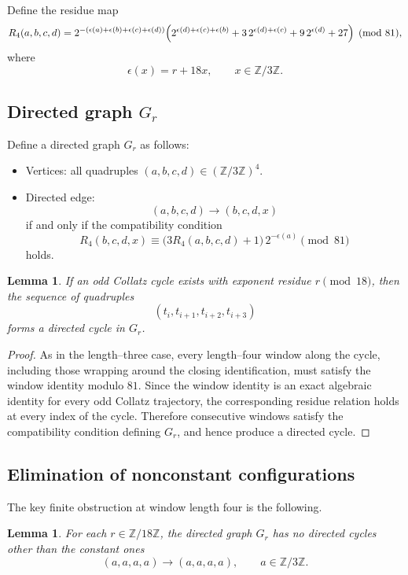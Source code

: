 \documentclass[11pt]{article}
\theoremstyle{definition}
\theoremstyle{plain}
\newtheorem{lemma}[theorem]{Lemma}
\theoremstyle{remark}
\begin{document}
Define the residue map
\begin{equation}\label{eq:R4def}
R_4(a,b,c,d)
=
2^{-(\epsilon(a)+\epsilon(b)+\epsilon(c)+\epsilon(d))}
\Bigl(
2^{\epsilon(d)+\epsilon(c)+\epsilon(b)}
+ 3\,2^{\epsilon(d)+\epsilon(c)}
+ 9\,2^{\epsilon(d)}
+ 27
\Bigr)
\pmod{81},
\end{equation}
where
\[
\epsilon(x)=r+18x,
\qquad x\in\mathbb{Z}/3\mathbb{Z}.
\]

\subsection{Directed graph $G_r$}

Define a directed graph $G_r$ as follows:

\begin{itemize}
\item Vertices: all quadruples $(a,b,c,d)\in(\mathbb{Z}/3\mathbb{Z})^4$.
\item Directed edge:
\[
(a,b,c,d)\longrightarrow (b,c,d,x)
\]
if and only if the compatibility condition
\[
R_4(b,c,d,x)
\equiv
\bigl(3R_4(a,b,c,d)+1\bigr)\,2^{-\epsilon(a)}
\pmod{81}
\]
holds.
\end{itemize}

\begin{lemma}\label{lem:cycle_implies_Gr_cycle}
If an odd Collatz cycle exists with exponent residue $r \pmod{18}$,
then the sequence of quadruples
\[
(t_i,t_{i+1},t_{i+2},t_{i+3})
\]
forms a directed cycle in $G_r$.
\end{lemma}

\begin{proof}
As in the length--three case, every length--four window along the cycle,
including those wrapping around the closing identification, must satisfy
the window identity modulo $81$.
Since the window identity is an exact algebraic identity for every odd
Collatz trajectory, the corresponding residue relation holds at every
index of the cycle.
Therefore consecutive windows satisfy the compatibility condition defining
$G_r$, and hence produce a directed cycle.
\end{proof}
\subsection{Elimination of nonconstant configurations}
The key finite obstruction at window length four is the following.

\begin{lemma}\label{lem:Gr_only_constant_cycles}
For each $r\in\mathbb{Z}/18\mathbb{Z}$, the directed graph $G_r$
has no directed cycles other than the constant ones
\[
(a,a,a,a)\to(a,a,a,a),
\qquad a\in\mathbb{Z}/3\mathbb{Z}.
\]
\end{lemma}
\end{document}
